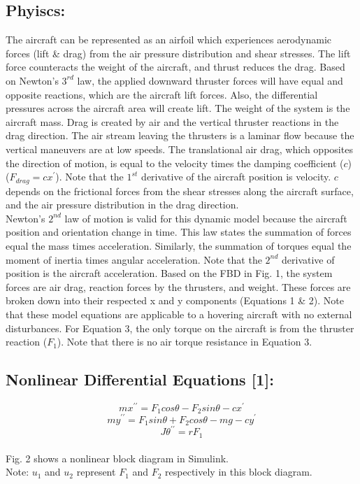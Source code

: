 \documentclass[conference]{IEEEtran}
\begin{document}
\subsection{Phyiscs:}
The aircraft can be represented as an airfoil which experiences aerodynamic forces (lift \& drag) from the air pressure distribution and shear stresses. The lift force counteracts the weight of the aircraft, and thrust reduces the drag. Based on Newton’s $3^{rd}$ law, the applied downward thruster forces will have equal and opposite reactions, which are the aircraft lift forces. Also, the differential pressures across the aircraft area will create lift. The weight of the system is the aircraft mass. Drag is created by air and the vertical thruster reactions in the drag direction. The air stream leaving the thrusters is a laminar flow because the vertical maneuvers are at low speeds. The translational air drag, which opposites the direction of motion, is equal to the velocity times the damping coefficient ($c$) 
 ($F_{drag} = cx^\prime$). Note that the $1^{st}$ derivative of the aircraft position is velocity. $c$ depends on the frictional forces from the shear stresses along the aircraft surface, and the air pressure distribution in the drag direction.\\

Newton's $2^{nd}$ law of motion is valid for this dynamic model because the aircraft position and orientation change in time. This law states the summation of forces equal the mass times acceleration. Similarly, the summation of torques equal the moment of inertia times angular acceleration. Note that the $2^{nd}$ derivative of position is the aircraft acceleration. Based on the FBD in Fig. 1, the system forces are air drag, reaction forces by the thrusters, and weight. These forces are broken down into their respected x and y components (Equations 1 \& 2). Note that these model equations are applicable to a hovering aircraft with no external disturbances. For Equation 3, the only torque on the aircraft is from the thruster reaction ($F_1$). Note that there is no air torque resistance in Equation 3.

\subsection{Nonlinear Differential Equations [1]:} 
\[
mx^{\prime\prime} = F_1cos\theta - F_2sin\theta - cx^{\prime}  \tag{1}
\] 
\[
my^{\prime\prime} = F_1sin \theta + F_2cos\theta - mg - cy^\prime \tag{2}
\]
\[
J\theta^{\prime\prime} = rF_1 \tag{3} 
\]\\
Fig. 2 shows a nonlinear block diagram in Simulink. \\
Note: $u_1$ and $u_2$ represent $F_1$ and $F_2$ respectively in this block diagram. \\
\end{document}
